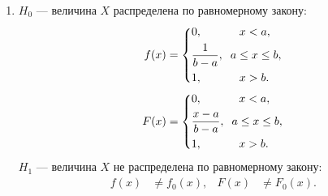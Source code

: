 \documentclass[14pt,hidelinks]{extarticle}
\begin{document}
\begin{enumerate}

\item
	$H_0$ --- величина $X$ распределена по равномерному закону:
	\begin{equation}
		\begin{aligned}
			f(x)=
			\left\{
				\begin{aligned}
					&0, \hspace{11.5mm} x < a, \\
					&\frac{1}{b-a}, \hspace{2mm} a \le x \le b, \\
					&1, \hspace{11.5mm} x > b.
				\end{aligned}
			\right.
		\end{aligned}
	\end{equation}
	\begin{equation}
		\begin{aligned}
			F(x)=
			\left\{
				\begin{aligned}
					&0, \hspace{11.5mm} x < a, \\
					&\frac{x-a}{b-a}, \hspace{2mm} a \le x \le b, \\
					&1, \hspace{11.5mm} x > b.
				\end{aligned}
			\right.
		\end{aligned}
	\end{equation}
	$H_1$ --- величина $X$ не распределена по равномерному закону:
	\begin{align}
		f(x) & \neq f_0(x) ,&
		F(x) & \neq F_0(x).
	\end{align}


\end{enumerate}
\end{document}
